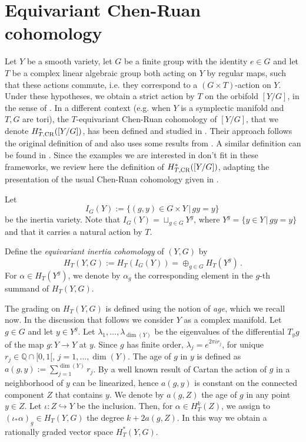 \documentclass[a4paper,reqno]{amsart}
\theoremstyle{plain} %
\theoremstyle{definition} %
\theoremstyle{remark} %
\newcommand{\Q}{\mathbb{Q}}
\newcommand{\1}{\mathds{1}}   %
\begin{document}
\section{Equivariant Chen-Ruan cohomology}\label{ecrc}
Let $Y$ be a smooth variety, let $G$ be a finite group with the identity $e\in G$ and let $T$ be a complex linear algebraic group 
both acting on $Y$ by regular maps, 
such that these actions commute, i.e. they correspond to a $(G\times T)$-action on $Y$.
Under these hypotheses, we obtain  a strict action by $T$ on the orbifold $[Y/G]$, in the sense of \cite{Romagny}.
In a different context (e.g. when $Y$ is a symplectic manifold and $T, G$ are tori),
the $T$-equivariant Chen-Ruan cohomology of $[Y/G]$, that we denote  $H^*_{T, \rm{CR}}([Y/G])$, 
has been defined and studied in \cite{HoMa}. Their approach follows the original definition of \cite{CR04}
and also uses some results from \cite{AGV08}. A similar definition can be found in \cite{Johnson}. 
Since the examples we are interested in don't fit in these frameworks, we review here the
definition of  $H^*_{T, \rm{CR}}([Y/G])$, adapting the presentation of the usual Chen-Ruan cohomology given in \cite{FG03}.

Let 
$$
I_G(Y):= \{ (g, y) \in G\times Y \, | \, gy=y\} \, 
$$
be the inertia variety. Note that $I_G(Y)= \sqcup_{g\in G}Y^g$, where $Y^g= \{ y\in Y \, | \, g y = y\}$
and that it carries a natural action by $T$.

Define the \textit{equivariant inertia cohomology} of $(Y, G)$ by
$$
H_T(Y, G) := H_T(I_G(Y))=  \oplus_{g\in G} H_T(Y^g) \, .
$$
For $\alpha \in H_T(Y^g)$, we denote by $\alpha_g$ the corresponding element 
in the $g$-th summand of $H_T(Y, G)$.

The grading on $H_T(Y, G)$ is defined using the notion of \textit{age}, which we recall now.
In the discussion that follows we consider $Y$ as a complex manifold.
Let $g\in G$ and let $y\in Y^g$. Let $\lambda_1, \ldots , \lambda_{\dim (Y)}$ be the eigenvalues of the 
differential $T_yg$ of the map $g\colon Y \to Y$ at $y$. Since $g$ has finite order,  $\lambda_j = e^{2\pi i r_j}$, 
for unique  $r_j \in \Q \cap [0, 1[$, $j=1, \ldots , \dim (Y)$. 
The age of $g$ in $y$ is defined as $a(g, y):= \sum_{j=1}^{\dim (Y)} r_j$.
By a well known result of Cartan the action of $g$ in a neighborhood of $y$  can be linearized, hence
$a(g, y)$ is constant on the connected component $Z$ that contains $y$. We denote by $a(g, Z)$ the age of $g$ in any point 
$y\in Z$.
Let $\iota \colon Z \hookrightarrow Y$ be the inclusion. Then, for   $\alpha \in H^k_T(Z)$, we assign 
to $(\iota_* \alpha)_g \in H_T(Y, G)$ the degree $k + 2a(g, Z)$. In this way we obtain a rationally graded 
vector space $H_T^*(Y, G)$.
\end{document}
